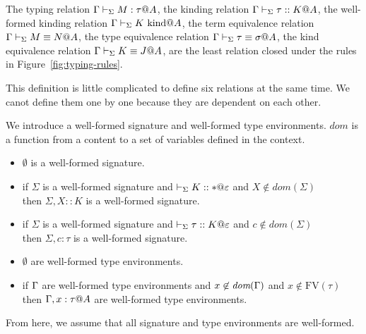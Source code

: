 \begin{definition}
	The typing relation $ \Gamma \vdash_\Sigma M : \tau @ A $,
	the kinding relation $\Gamma \vdash_\Sigma \tau :: K @ A$,
	the well-formed kinding relation $\Gamma \vdash_\Sigma K \text{\ kind} @ A$,
	the term equivalence relation $\Gamma \vdash_\Sigma M \equiv N @ A$,
	the type equivalence relation $\Gamma \vdash_\Sigma \tau \equiv \sigma @ A$,
	the kind equivalence relation $\Gamma \vdash_\Sigma K \equiv J @ A$,
	are the least relation closed under the rules in Figure~\ref{fig:typing-rules}.
\end{definition}
This definition is little complicated to define six relations at the same time.
We canot define them one by one because they are dependent on each other.

We introduce a well-formed signature and well-formed type environments.
$\textit{dom}$ is a function from a content to a set of variables defined in the context.
\begin{definition}
	\begin{itemize}
		\item $\emptyset$ is a well-formed signature.
		\item if $\Sigma$ is a well-formed signature and $\vdash_\Sigma K :: * @ \varepsilon$ and $X\notin\textit{dom}(\Sigma)$ \\
		      then $\Sigma,X::K$ is a well-formed signature.
		\item if $\Sigma$ is a well-formed signature and $\vdash_\Sigma \tau :: K @ \varepsilon$ and $c\notin\textit{dom}(\Sigma)$ \\
		      then $\Sigma,c:\tau$ is a well-formed signature.
	\end{itemize}
\end{definition}
\begin{definition}
	\begin{itemize}
		\item $\emptyset$ are well-formed type environments.
		\item if $\Gamma$ are well-formed type environments and $x\not\in\textit{dom}(\Gamma)$ and $x\not\in\textrm{FV}(\tau)$ \\
		      then $\G,x:\tau@A$ are well-formed type environments.
	\end{itemize}
\end{definition}
From here, we assume that all signature and type environments are well-formed.

